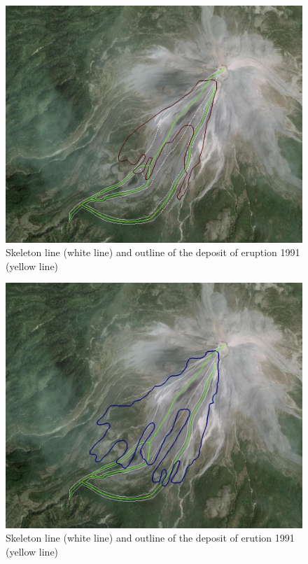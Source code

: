 \documentclass[letterpaper,10pt]{article}
\begin{document}
\begin{figure}[H]
\centerline{\includegraphics[width=\textwidth]{IMAGES/levelset1.jpg}}
\caption{Skeleton line (white line) and outline of the deposit of eruption 1991 (yellow line)}
\label{level_colima}
\end{figure}
 
 \begin{figure}[H]
 \centerline{\includegraphics[scale=0.5]{IMAGES/tiny1.jpg}}
 \caption{Skeleton line (white line) and outline of the deposit of erution 1991 (yellow line)}
 \label{tiny_colima}
 \end{figure}
 
\end{document}
